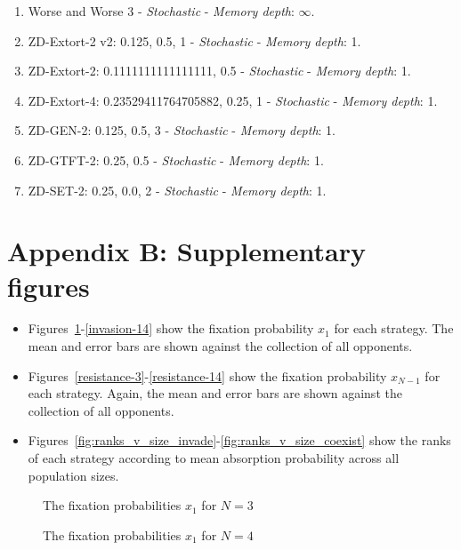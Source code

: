 \documentclass[10pt,letterpaper]{article}
\begin{document}
\begin{enumerate}
\item Worse and Worse 3 - \textit{Stochastic} - \textit{Memory depth}: \(\infty\). \cite{Prison1998}
\item ZD-Extort-2 v2: 0.125, 0.5, 1 - \textit{Stochastic} - \textit{Memory depth}: 1. \cite{Kuhn2017}
\item ZD-Extort-2: 0.1111111111111111, 0.5 - \textit{Stochastic} - \textit{Memory depth}: 1. \cite{Stewart2012}
\item ZD-Extort-4: 0.23529411764705882, 0.25, 1 - \textit{Stochastic} - \textit{Memory depth}: 1. \cite{axelrodproject}
\item ZD-GEN-2: 0.125, 0.5, 3 - \textit{Stochastic} - \textit{Memory depth}: 1. \cite{Kuhn2017}
\item ZD-GTFT-2: 0.25, 0.5 - \textit{Stochastic} - \textit{Memory depth}: 1. \cite{Stewart2012}
\item ZD-SET-2: 0.25, 0.0, 2 - \textit{Stochastic} - \textit{Memory depth}: 1. \cite{Kuhn2017}
\end{enumerate}

\section{Appendix B: Supplementary figures}

\begin{itemize}
    \item Figures~\ref{invasion-3}-\ref{invasion-14} show the fixation probability \(x_1\)
for each strategy. The mean and error bars are shown against the collection of
all opponents.

    \item Figures~\ref{resistance-3}-\ref{resistance-14} show the fixation probability
\(x_{N-1}\) for each strategy. Again, the mean and error bars are shown against
the collection of all opponents.

    \item Figures~\ref{fig:ranks_v_size_invade}-\ref{fig:ranks_v_size_coexist} show the
ranks of each strategy according to mean absorption probability across all
population sizes.
\end{itemize}

\begin{figure}[!hbtp]
    \centering
    \caption{The fixation probabilities \(x_1\) for \(N=3\)}
    \label{invasion-3}
\end{figure}

\begin{figure}[!hbtp]
    \centering
    \caption{The fixation probabilities \(x_1\) for \(N=4\)}
\end{figure}
\end{document}
